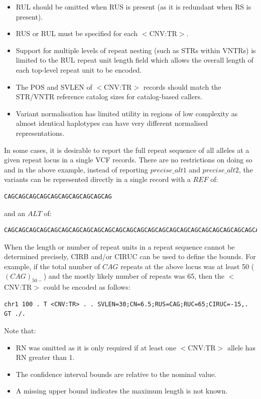 \documentclass[8pt]{article}
\begin{document}
\begin{itemize}
    \item RUL should be omitted when RUS is present (as it is redundant when RS is present).
    \item RUS or RUL must be specified for each $<$CNV:TR$>$.
    \item Support for multiple levels of repeat nesting (such as STRs within VNTRs) is limited to the RUL repeat unit length field which allows the overall length of each top-level repeat unit to be encoded.
    \item The POS and SVLEN of $<$CNV:TR$>$ records should match the STR/VNTR reference catalog sizes for catalog-based callers.
    \item Variant normalisation has limited utility in regions of low complexity as almost identical haplotypes can have very different normalised representations.
\end{itemize}

In some cases, it is desirable to report the full repeat sequence of all alleles at a given repeat locus in a single VCF records.
There are no restrictions on doing so and in the above example, instead of reporting $precise\_alt1$ and $precise\_alt2$, the variants can be represented directly in a single record with a $REF$ of:
\scriptsize
\begin{verbatim}
CAGCAGCAGCAGCAGCAGCAGCAGCAGCAG
\end{verbatim}
\normalsize
and an $ALT$ of:
\scriptsize
\begin{verbatim}
CAGCAGCAGCAGCAGCAGCAGCAGCAGCAGCAGCAGCAGCAGCAGCAGCAGCAGCAGCAGCAGCAGCAGCAGCAGCAGCAGCAGCAGCAG,CAGCAGCAGCAGCAGCACAGCAGCAGCAG
\end{verbatim}
\normalsize

When the length or number of repeat units in a repeat sequence cannot be determined precisely, CIRB and/or CIRUC can be used to define the bounds.
For example, if the total number of $CAG$ repeats at the above locus was at least 50 ($(CAG)_{50-}$) and the mostly likely number of repeats was 65, then the $<$CNV:TR$>$ could be encoded as follows:

\footnotesize
\begin{verbatim}
chr1 100 . T <CNV:TR> . . SVLEN=30;CN=6.5;RUS=CAG;RUC=65;CIRUC=-15,. GT ./.
\end{verbatim}
\normalsize

Note that:
\begin{itemize}
	\item RN was omitted as it is only required if at least one $<$CNV:TR$>$ allele has RN greater than 1.
	\item The confidence interval bounds are relative to the nominal value.
	\item A missing upper bound indicates the maximum length is not known.
\end{itemize}
\end{document}
